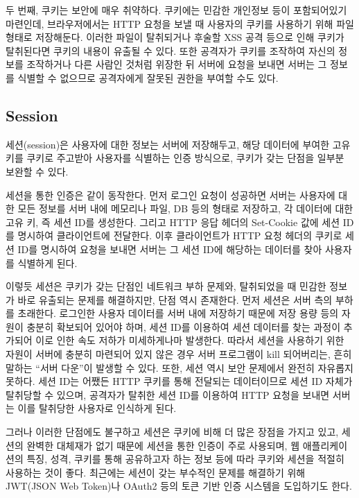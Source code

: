 두 번째, 쿠키는 보안에 매우 취약하다. 쿠키에는 민감한 개인정보 등이 포함되어있기 마련인데, 브라우저에서는 HTTP 요청을 보낼 때 사용자의 쿠키를 사용하기 위해 파일 형태로 저장해둔다. 이러한 파일이 탈취되거나 후술할 XSS 공격 등으로 인해 쿠키가 탈취된다면 쿠키의 내용이 유출될 수 있다. 또한 공격자가 쿠키를 조작하여 자신의 정보를 조작하거나 다른 사람인 것처럼 위장한 뒤 서버에 요청을 보내면 서버는 그 정보를 식별할 수 없으므로 공격자에게 잘못된 권한을 부여할 수도 있다.

\subsection*{Session}

세션(session)은 사용자에 대한 정보는 서버에 저장해두고, 해당 데이터에 부여한 고유 키를 쿠키로 주고받아 사용자를 식별하는 인증 방식으로, 쿠키가 갖는 단점을 일부분 보완할 수 있다.

세션을 통한 인증은 \과 같이 동작한다. 먼저 로그인 요청이 성공하면 서버는 사용자에 대한 모든 정보를 서버 내에 메모리나 파일, DB 등의 형태로 저장하고, 각 데이터에 대한 고유 키, 즉 세션 ID를 생성한다. 그리고 HTTP 응답 헤더의 Set-Cookie 값에 세션 ID를 명시하여 클라이언트에 전달한다. 이후 클라이언트가 HTTP 요청 헤더의 쿠키로 세션 ID를 명시하여 요청을 보내면 서버는 그 세션 ID에 해당하는 데이터를 찾아 사용자를 식별하게 된다.

이렇듯 세션은 쿠키가 갖는 단점인 네트워크 부하 문제와, 탈취되었을 때 민감한 정보가 바로 유출되는 문제를 해결하지만, 단점 역시 존재한다. 먼저 세션은 서버 측의 부하를 초래한다. 로그인한 사용자 데이터를 서버 내에 저장하기 때문에 저장 용량 등의 자원이 충분히 확보되어 있어야 하며, 세션 ID를 이용하여 세션 데이터를 찾는 과정이 추가되어 이로 인한 속도 저하가 미세하게나마 발생한다. 따라서 세션을 사용하기 위한 자원이 서버에 충분히 마련되어 있지 않은 경우 서버 프로그램이 kill 되어버리는, 흔히 말하는 ``서버 다운''이 발생할 수 있다. 또한, 세션 역시 보안 문제에서 완전히 자유롭지 못하다. 세션 ID는 어쨌든 HTTP 쿠키를 통해 전달되는 데이터이므로 세션 ID 자체가 탈취당할 수 있으며, 공격자가 탈취한 세션 ID를 이용하여 HTTP 요청을 보내면 서버는 이를 탈취당한 사용자로 인식하게 된다.

그러나 이러한 단점에도 불구하고 세션은 쿠키에 비해 더 많은 장점을 가지고 있고, 세션의 완벽한 대체재가 없기 때문에 세션을 통한 인증이 주로 사용되며, 웹 애플리케이션의 특징, 성격, 쿠키를 통해 공유하고자 하는 정보 등에 따라 쿠키와 세션을 적절히 사용하는 것이 좋다. 최근에는 세션이 갖는 부수적인 문제를 해결하기 위해 JWT(JSON Web Token)나 OAuth2 등의 토큰 기반 인증 시스템을 도입하기도 한다.

